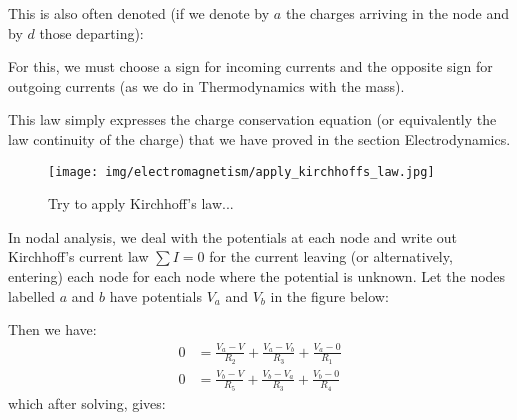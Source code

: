 	This is also often denoted (if we denote by $a$ the charges arriving in the node and by $d$ those departing):
	
	For this, we must choose a sign for incoming currents and the opposite sign for outgoing currents (as we do in Thermodynamics with the mass).
	\begin{tcolorbox}[title=Remark,colframe=black,arc=10pt]
	This law simply expresses the charge conservation equation (or equivalently the law continuity of the charge) that we have proved in the section Electrodynamics.
	\end{tcolorbox}
	\begin{figure}[H]
		\centering
		\texttt{[image: img/electromagnetism/apply\_kirchhoffs\_law.jpg]}
		\caption[]{Try to apply Kirchhoff's law...}
	\end{figure}
	In nodal analysis, we deal with the potentials at each node and write out Kirchhoff's current law $\sum I = 0$ for the current leaving (or alternatively, entering) each node for each node where the potential is unknown. Let the nodes labelled $a$ and $b$ have potentials $V_a$ and $V_b$ in the figure below:
    
    \begin{center}
    \end{center}
     Then we have:
    \begin{align}
        0 &= \frac{V_a-V}{R_2} + \frac{V_a-V_b}{R_3} + \frac{V_a-0}{R_1} \\
        0 &= \frac{V_b-V}{R_5} + \frac{V_b-V_a}{R_3} + \frac{V_b-0}{R_4} 
    \end{align}
    which after solving, gives:
    
